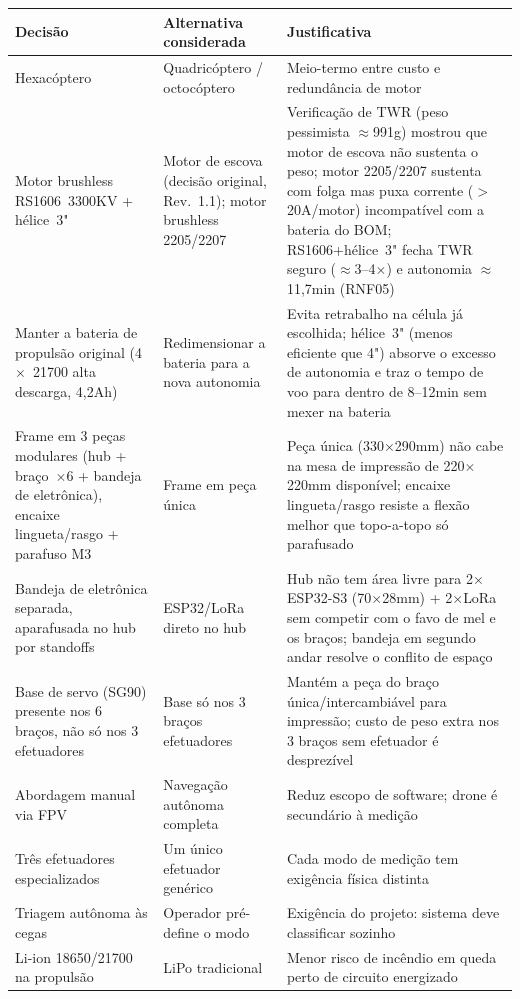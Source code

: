 \documentclass[11pt,a4paper]{article}
\begin{document}
\begin{longtable}{@{}p{4.4cm}p{4.4cm}p{5.4cm}@{}}
\toprule
\textbf{Decisão} & \textbf{Alternativa considerada} & \textbf{Justificativa} \\
\midrule
\endhead
\bottomrule
\endfoot
Hexacóptero & Quadricóptero / octocóptero & Meio-termo entre custo e redundância de motor \\
Motor brushless RS1606~3300KV + hélice~3" & Motor de escova (decisão original, Rev.~1.1); motor brushless 2205/2207 & Verificação de TWR (peso pessimista $\approx$991g) mostrou que motor de escova não sustenta o peso; motor 2205/2207 sustenta com folga mas puxa corrente ($>$20A/motor) incompatível com a bateria do BOM; RS1606+hélice~3" fecha TWR seguro ($\approx$3--4$\times$) e autonomia $\approx$11,7min (RNF05) \\
Manter a bateria de propulsão original (4$\times$~21700 alta descarga, 4,2Ah) & Redimensionar a bateria para a nova autonomia & Evita retrabalho na célula já escolhida; hélice~3" (menos eficiente que 4") absorve o excesso de autonomia e traz o tempo de voo para dentro de 8--12min sem mexer na bateria \\
Frame em 3 peças modulares (hub + braço~$\times$6 + bandeja de eletrônica), encaixe lingueta/rasgo + parafuso M3 & Frame em peça única & Peça única (330$\times$290mm) não cabe na mesa de impressão de 220$\times$220mm disponível; encaixe lingueta/rasgo resiste a flexão melhor que topo-a-topo só parafusado \\
Bandeja de eletrônica separada, aparafusada no hub por standoffs & ESP32/LoRa direto no hub & Hub não tem área livre para 2$\times$ESP32-S3 (70$\times$28mm) + 2$\times$LoRa sem competir com o favo de mel e os braços; bandeja em segundo andar resolve o conflito de espaço \\
Base de servo (SG90) presente nos 6 braços, não só nos 3 efetuadores & Base só nos 3 braços efetuadores & Mantém a peça do braço única/intercambiável para impressão; custo de peso extra nos 3 braços sem efetuador é desprezível \\
Abordagem manual via FPV & Navegação autônoma completa & Reduz escopo de software; drone é secundário à medição \\
Três efetuadores especializados & Um único efetuador genérico & Cada modo de medição tem exigência física distinta \\
Triagem autônoma às cegas & Operador pré-define o modo & Exigência do projeto: sistema deve classificar sozinho \\
Li-ion 18650/21700 na propulsão & LiPo tradicional & Menor risco de incêndio em queda perto de circuito energizado \\

\end{longtable}
\end{document}
